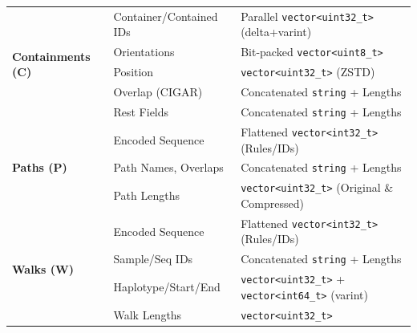 \begin{table}[t]
{\begin{tabular}{lll}
      \multirow{5}{*}{\textbf{Containments (C)}} & Container/Contained IDs   & Parallel \texttt{vector<uint32\_t>} (delta+varint)                  \\
                                                 & Orientations              & Bit-packed \texttt{vector<uint8\_t>}                                \\
                                                 & Position                  & \texttt{vector<uint32\_t>} (ZSTD)                                   \\
                                                 & Overlap (CIGAR)           & Concatenated \texttt{string} + Lengths                              \\
                                                 & Rest Fields               & Concatenated \texttt{string} + Lengths                              \\ \midrule

      \multirow{3}{*}{\textbf{Paths (P)}}        & Encoded Sequence          & Flattened \texttt{vector<int32\_t>} (Rules/IDs)                     \\
                                                 & Path Names, Overlaps      & Concatenated \texttt{string} + Lengths                              \\
                                                 & Path Lengths              & \texttt{vector<uint32\_t>} (Original \& Compressed)                 \\ \midrule

      \multirow{4}{*}{\textbf{Walks (W)}}        & Encoded Sequence          & Flattened \texttt{vector<int32\_t>} (Rules/IDs)                     \\
                                                 & Sample/Seq IDs            & Concatenated \texttt{string} + Lengths                              \\
                                                 & Haplotype/Start/End       & \texttt{vector<uint32\_t>} + \texttt{vector<int64\_t>} (varint)     \\
                                                 & Walk Lengths              & \texttt{vector<uint32\_t>}                                          \\
      \bottomrule
    \end{tabular}%
  }
\end{table}



